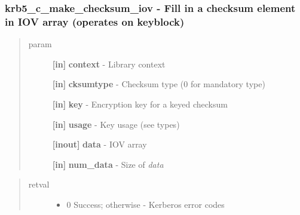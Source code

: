\documentclass[letterpaper,10pt,english]{sphinxmanual}
\begin{document}
\subsubsection{krb5\_c\_make\_checksum\_iov -  Fill in a checksum element in IOV array (operates on keyblock)}
\label{appdev/refs/api/krb5_c_make_checksum_iov:krb5-c-make-checksum-iov-fill-in-a-checksum-element-in-iov-array-operates-on-keyblock}\label{appdev/refs/api/krb5_c_make_checksum_iov::doc}

\begin{fulllineitems}
\label{appdev/refs/api/krb5_c_make_checksum_iov:krb5_c_make_checksum_iov}
\end{fulllineitems}

\begin{quote}\begin{description}
\item[{param}] \leavevmode
\textbf{{[}in{]}} \textbf{context} - Library context

\textbf{{[}in{]}} \textbf{cksumtype} - Checksum type (0 for mandatory type)

\textbf{{[}in{]}} \textbf{key} - Encryption key for a keyed checksum

\textbf{{[}in{]}} \textbf{usage} - Key usage (see  types)

\textbf{{[}inout{]}} \textbf{data} - IOV array

\textbf{{[}in{]}} \textbf{num\_data} - Size of \emph{data}

\end{description}\end{quote}
\begin{quote}\begin{description}
\item[{retval}] \leavevmode\begin{itemize}
\item {} 
0   Success; otherwise - Kerberos error codes

\end{itemize}

\end{description}\end{quote}
\end{document}
